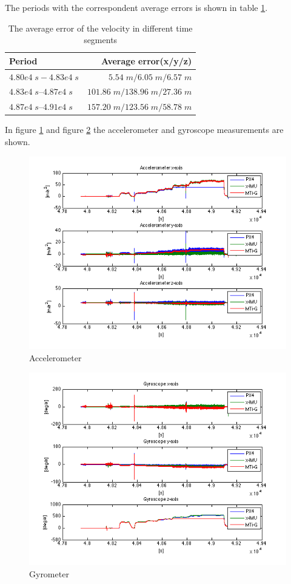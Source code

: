 The periods with the correspondent average errors is shown in table \ref{ct_vel_error}.
\begin{table}[h]
\centering
\begin{tabular}{|l|r|}
\hline
Period & Average error(x/y/z) \\
\hline
$4.80e4\;s - 4.83e4\;s$&$5.54\;m / 6.05\;m / 6.57\;m$\\
\hline
$4.83e4\;s – 4.87e4\;s$&$101.86\;m / 138.96\;m/ 27.36\;m$\\
\hline
$4.87e4\;s – 4.91e4\;s$&$157.20\;m / 123.56\;m / 58.78\;m$\\
\hline
\end{tabular}
\caption{The average error of the velocity in different time segments}
\label{ct_vel_error}
\end{table}
In figure \ref{ct_acc} and figure \ref{ct_gyro} the accelerometer and gyroscope measurements are shown. 
\begin{figure}[h]
\includegraphics[width=1\textwidth]{pictures/ct_acc.png}
\caption{Accelerometer}
\label{ct_acc}
\end{figure}
\begin{figure}[hb]
\includegraphics[width=1\textwidth]{pictures/ct_gyro.png}
\caption{Gyrometer}
\label{ct_gyro}
\end{figure}
